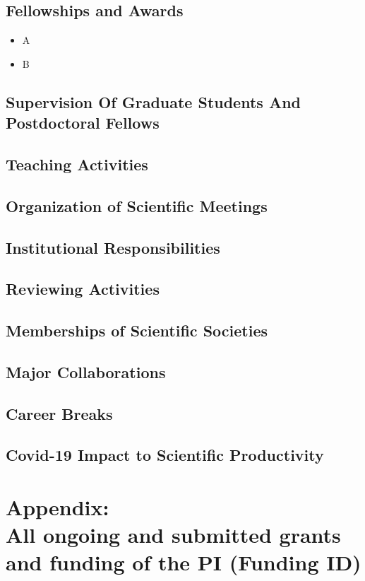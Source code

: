 \documentclass[COG,11pt]{ercgrant}
\begin{document}
\subsection{Fellowships and Awards}
\color{red}
\begin{itemize}
	\item A
	\item B
\end{itemize}
\color{black}

\subsection{Supervision Of Graduate Students And Postdoctoral Fellows}
\subsection{Teaching Activities}
\subsection{Organization of Scientific Meetings}
\subsection{Institutional Responsibilities}
\subsection{Reviewing Activities}
\subsection{Memberships of Scientific Societies}
\subsection{Major Collaborations}
\subsection{Career Breaks}
\subsection{Covid-19 Impact to Scientific Productivity}

\newpage
\section*{Appendix:\\ All ongoing and submitted grants and funding of the PI (Funding ID)}
\end{document}
